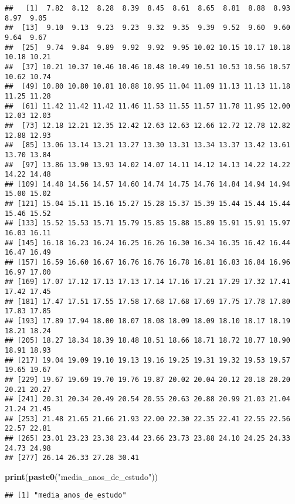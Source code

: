 \documentclass[
]{article}
\newenvironment{Shaded}{\begin{snugshade}}{\end{snugshade}}
\newcommand{\FunctionTok}[1]{\textcolor[rgb]{0.13,0.29,0.53}{\textbf{#1}}}
\newcommand{\NormalTok}[1]{#1}
\newcommand{\StringTok}[1]{\textcolor[rgb]{0.31,0.60,0.02}{#1}}
\begin{document}
\begin{verbatim}
##   [1]  7.82  8.12  8.28  8.39  8.45  8.61  8.65  8.81  8.88  8.93  8.97  9.05
##  [13]  9.10  9.13  9.23  9.23  9.32  9.35  9.39  9.52  9.60  9.60  9.64  9.67
##  [25]  9.74  9.84  9.89  9.92  9.92  9.95 10.02 10.15 10.17 10.18 10.18 10.21
##  [37] 10.21 10.37 10.46 10.46 10.48 10.49 10.51 10.53 10.56 10.57 10.62 10.74
##  [49] 10.80 10.80 10.81 10.88 10.95 11.04 11.09 11.13 11.13 11.18 11.25 11.28
##  [61] 11.42 11.42 11.42 11.46 11.53 11.55 11.57 11.78 11.95 12.00 12.03 12.03
##  [73] 12.18 12.21 12.35 12.42 12.63 12.63 12.66 12.72 12.78 12.82 12.88 12.93
##  [85] 13.06 13.14 13.21 13.27 13.30 13.31 13.34 13.37 13.42 13.61 13.70 13.84
##  [97] 13.86 13.90 13.93 14.02 14.07 14.11 14.12 14.13 14.22 14.22 14.22 14.48
## [109] 14.48 14.56 14.57 14.60 14.74 14.75 14.76 14.84 14.94 14.94 15.00 15.02
## [121] 15.04 15.11 15.16 15.27 15.28 15.37 15.39 15.44 15.44 15.44 15.46 15.52
## [133] 15.52 15.53 15.71 15.79 15.85 15.88 15.89 15.91 15.91 15.97 16.03 16.11
## [145] 16.18 16.23 16.24 16.25 16.26 16.30 16.34 16.35 16.42 16.44 16.47 16.49
## [157] 16.59 16.60 16.67 16.76 16.76 16.78 16.81 16.83 16.84 16.96 16.97 17.00
## [169] 17.07 17.12 17.13 17.13 17.14 17.16 17.21 17.29 17.32 17.41 17.42 17.45
## [181] 17.47 17.51 17.55 17.58 17.68 17.68 17.69 17.75 17.78 17.80 17.83 17.85
## [193] 17.89 17.94 18.00 18.07 18.08 18.09 18.09 18.10 18.17 18.19 18.21 18.24
## [205] 18.27 18.34 18.39 18.48 18.51 18.66 18.71 18.72 18.77 18.90 18.91 18.93
## [217] 19.04 19.09 19.10 19.13 19.16 19.25 19.31 19.32 19.53 19.57 19.65 19.67
## [229] 19.67 19.69 19.70 19.76 19.87 20.02 20.04 20.12 20.18 20.20 20.21 20.27
## [241] 20.31 20.34 20.49 20.54 20.55 20.63 20.88 20.99 21.03 21.04 21.24 21.45
## [253] 21.48 21.65 21.66 21.93 22.00 22.30 22.35 22.41 22.55 22.56 22.57 22.81
## [265] 23.01 23.23 23.38 23.44 23.66 23.73 23.88 24.10 24.25 24.33 24.73 24.98
## [277] 26.14 26.33 27.28 30.41
\end{verbatim}

\begin{Shaded}
\begin{Highlighting}[]
\FunctionTok{print}\NormalTok{(}\FunctionTok{paste0}\NormalTok{(}\StringTok{"media\_anos\_de\_estudo"}\NormalTok{))}
\end{Highlighting}
\end{Shaded}

\begin{verbatim}
## [1] "media_anos_de_estudo"
\end{verbatim}
\end{document}
